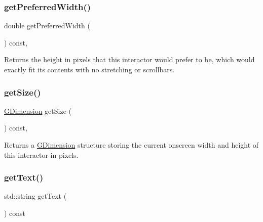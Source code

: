 \subsubsection{\texorpdfstring{get\+Preferred\+Width()}{getPreferredWidth()}}
{\footnotesize\ttfamily double get\+Preferred\+Width (\begin{DoxyParamCaption}{ }\end{DoxyParamCaption}) const\hspace{0.3cm}{\ttfamily [virtual]}, {\ttfamily [inherited]}}



Returns the height in pixels that this interactor would prefer to be, which would exactly fit its contents with no stretching or scrollbars. 

\mbox{\label{classsgl_1_1GInteractor_a7b4eec96a2bdc6420695d5796a78eea9}} 
\subsubsection{\texorpdfstring{get\+Size()}{getSize()}}
{\footnotesize\ttfamily \mbox{\hyperlink{structsgl_1_1GDimension}{G\+Dimension}} get\+Size (\begin{DoxyParamCaption}{ }\end{DoxyParamCaption}) const\hspace{0.3cm}{\ttfamily [virtual]}, {\ttfamily [inherited]}}



Returns a \mbox{\hyperlink{structsgl_1_1GDimension}{G\+Dimension}} structure storing the current onscreen width and height of this interactor in pixels. 

\mbox{\label{classsgl_1_1GRadioButton_aff553c50924b836c29f146ed34a7c6ec}} 
\subsubsection{\texorpdfstring{get\+Text()}{getText()}}
{\footnotesize\ttfamily std\+::string get\+Text (\begin{DoxyParamCaption}{ }\end{DoxyParamCaption}) const\hspace{0.3cm}{\ttfamily [virtual]}}



